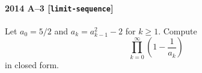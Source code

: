 \paragraph{2014 A--3 \textnormal{[\texttt{limit-sequence}]}}
Let $a_0 = 5/2$ and $a_k = a_{k-1}^2 - 2$ for $k \geq 1$. Compute
\[
\prod_{k=0}^\infty \left(1 - \frac{1}{a_k} \right)
\]
in closed form.

